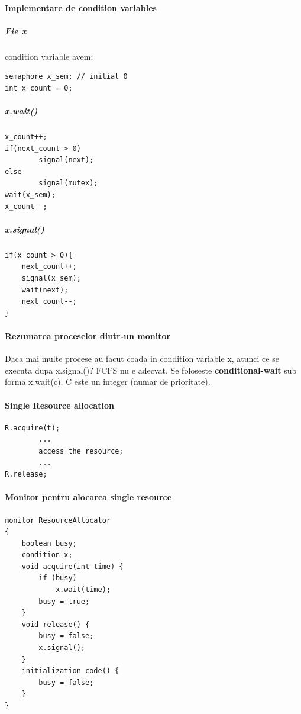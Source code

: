 \documentclass{article}
\begin{document}
\paragraph*{Implementare de condition variables}
\subparagraph*{Fie x} condition variable avem:
\begin{center}
    \begin{lstlisting}
semaphore x_sem; // initial 0
int x_count = 0;
    \end{lstlisting}
\end{center}
\subparagraph*{x.wait()}
\begin{center}
    \begin{lstlisting}
x_count++;
if(next_count > 0)
        signal(next);
else
        signal(mutex);
wait(x_sem);
x_count--;
    \end{lstlisting}
\end{center}
\subparagraph*{x.signal()}
\begin{center}
    \begin{lstlisting}
if(x_count > 0){
    next_count++;
    signal(x_sem);
    wait(next);
    next_count--;
}
    \end{lstlisting}
\end{center}

\paragraph*{Rezumarea proceselor dintr-un monitor} Daca mai multe procese au facut coada in condition variable x, atunci ce se executa dupa x.signal()? FCFS nu e adecvat. Se foloseste \textbf{conditional-wait} sub forma x.wait(c). C este un integer (numar de prioritate).

\paragraph*{Single Resource allocation}
\begin{center}
    \begin{lstlisting}
R.acquire(t);
        ...
        access the resource;
        ...
R.release;
    \end{lstlisting}
\end{center}
\paragraph*{Monitor pentru alocarea single resource}
\begin{center}    
\begin{lstlisting}
monitor ResourceAllocator 
{ 
    boolean busy; 
    condition x; 
    void acquire(int time) { 
        if (busy) 
            x.wait(time); 
        busy = true; 
    } 
    void release() { 
        busy = false; 
        x.signal(); 
    } 
    initialization code() {
        busy = false; 
    }
}		
\end{lstlisting}
\end{center}
\end{document}
